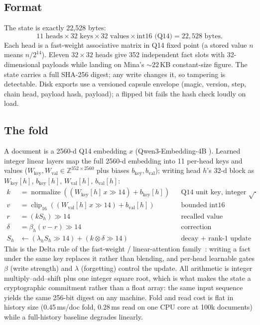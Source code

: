\documentclass[11pt]{article}
\newcommand{\statebytes}{22{,}528}
\begin{document}
\subsection{Format}
The state is exactly \statebytes{} bytes:
\[
11 \text{ heads} \times 32 \text{ keys} \times 32 \text{ values}
\times \text{int16 (Q14)} = 22{,}528 \text{ bytes}.
\]
Each head is a fast-weight associative matrix in Q14 fixed point (a
stored value $n$ means $n/2^{14}$). Eleven $32\times32$ heads give 352
independent fact slots with 32-dimensional payloads while landing on
Mina's ${\sim}22$\,KB constant-size figure. The state carries a full
SHA-256 digest; any write changes it, so tampering is detectable. Disk
exports use a versioned capsule envelope (magic, version, step, chain
head, payload hash, payload); a flipped bit fails the hash check loudly
on load.

\subsection{The fold}
A document is a 2560-d Q14 embedding $x$ (Qwen3-Embedding-4B
\cite{qwen3}). Learned integer linear layers map the full 2560-d
embedding into 11 per-head keys and values ($W_{\text{key}},
W_{\text{val}} \in \mathbb{Z}^{352 \times 2560}$ plus biases $b_{\text{key}},
b_{\text{val}}$); writing head $h$'s 32-d block as $W_{\text{key}}[h]$,
$b_{\text{key}}[h]$, $W_{\text{val}}[h]$, $b_{\text{val}}[h]$:
\begin{align}
k &= \operatorname{normalize}\!\left((W_{\text{key}}[h]\, x \gg 14) + b_{\text{key}}[h]\right)
  && \text{Q14 unit key, integer }\sqrt{\cdot}\\
v &= \operatorname{clip}_{16}\!\left((W_{\text{val}}[h]\, x \gg 14) + b_{\text{val}}[h]\right)
  && \text{bounded int16}\\
r &= (k S_h) \gg 14
  && \text{recalled value}\\
\delta &= \beta_h (v - r) \gg 14
  && \text{correction}\\
S_h &\leftarrow (\lambda_h S_h \gg 14) + (k \otimes \delta \gg 14)
  && \text{decay + rank-1 update}
\end{align}
This is the Delta rule of the fast-weight / linear-attention
family~\cite{schlag2021fast,yang2024delta}: writing a fact under the
same key replaces it rather than blending, and per-head learnable
gates $\beta$ (write strength) and $\lambda$ (forgetting) control the
update. All arithmetic is integer multiply--add--shift plus one
integer square root, which is what makes the state a cryptographic
commitment rather than a float array: the same input sequence yields
the same 256-bit digest on any machine. Fold and read cost is flat in
history size (0.45\,ms/doc fold, 0.28\,ms read on one CPU core at
100k documents) while a full-history baseline degrades linearly.
\end{document}
